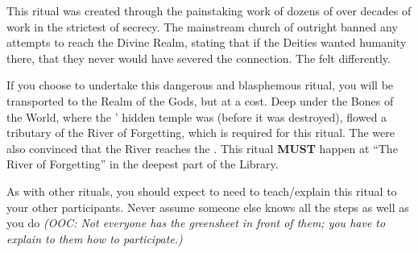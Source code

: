 \documentclass[green]{GL2020}
\begin{document}
\name{\gRitualDivineRealm{}}

This ritual was created through the painstaking work of dozens of \cDisneySect{} over decades of work in the strictest of secrecy. The mainstream church of \cFarmGod{} outright banned any attempts to reach the Divine Realm, stating that if the Deities wanted humanity there, that they never would have severed the connection. The \cDisneySect{} felt differently. 

If you choose to undertake this dangerous and blasphemous ritual, you will be transported to the Realm of the Gods, but at a cost. Deep under the Bones of the World, where the \cDisneySect{}' hidden temple was (before it was destroyed), flowed a tributary of the River of Forgetting, which is required for this ritual. The \cDisneySect{} were also convinced that the River reaches the \pSchool{}. This ritual \textbf{MUST} happen at ``The River of Forgetting'' in the deepest part of the Library.

As with other rituals, you should expect to need to teach/explain this ritual to your other participants. Never assume someone else knows all the steps as well as you do \emph{(OOC: Not everyone has the greensheet in front of them; you have to explain to them how to participate.)}
\end{document}
